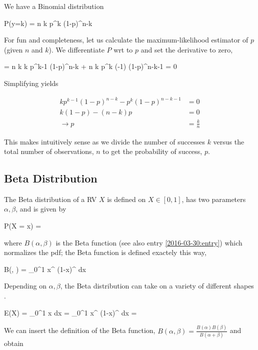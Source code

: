 
We have a Binomial distribution 

\bee
P(y=k) = {n \choose k} p^k (1-p)^{n-k}
\eee

For fun and completeness, let us calculate the maximum-likelihood estimator of $p$ (given $n$ and $k$). We differentiate $P$ wrt to $p$ and set the derivative to zero,

\bee
{} = {n \choose k} k p^{k-1} (1-p)^{n-k} + {n \choose k} p^k (-1) (1-p)^{n-k-1} = 0
\eee

Simplifying yields

\begin{align*}
k p^{k-1} (1-p)^{n-k} - p^k (1-p)^{n-k-1} & = 0 \\
k(1-p) - (n-k)p &= 0 \\
\rightarrow p &= \frac{k}{n}
\end{align*}

This makes intuitively sense as we divide the number of successes $k$ versus the total number of observations, $n$ to get the probability of success, $p$.

\subsection{Beta Distribution}

The Beta distribution of a RV $X$ is defined on $X \in [0,1]$, has two parameters $\alpha, \beta$, and is given by

\bee
P(X = x) = 
\eee

where $B(\alpha, \beta)$ is the Beta function (see also entry \ref{2016-03-30:entry}) which normalizes the pdf; the Beta function is defined exactely this way,

\bee
B(\alpha, \beta) = \int_0^1 x^{} (1-x)^{} dx
\eee

Depending on $\alpha, \beta$, the Beta distribution can take on a variety of different shapes .


\bee
E(X) = \int_0^1 x  dx =  \int_0^1 x^{\alpha} (1-x)^{} dx =  
\eee

We can insert the definition of the Beta function, $B(\alpha, \beta) = \frac{B(\alpha) B(\beta)}{B(\alpha+\beta)}$ and obtain

